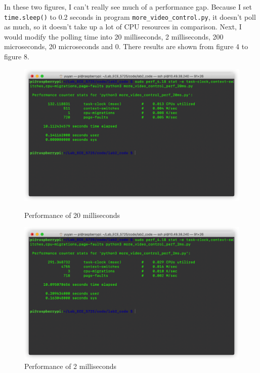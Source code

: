 \documentclass[12pt]{report}
\newcommand{\code}[1]{\colorbox{light-gray}{\texttt{#1}}}
\begin{document}
In these two figures, I can't really see much of a performance gap. Because I set \code{time.sleep()} to 0.2 seconds in program \code{more\_video\_control.py}, it doesn't poll as much, so it doesn't take up a lot of CPU resources in comparison. Next, I would modify the polling time into 20 milliseconds, 2 milliseconds, 200 microseconds, 20 microseconds and 0. There results are shown from figure 4 to figure 8.
\begin{figure}[H]
\centering
\begin{minipage}[t]{0.48\textwidth}
\centering
\includegraphics[width=\textwidth]{img/more_video_control_perf_20ms.png}
\caption{Performance of 20 milliseconds}
\label{fig:fig4}
\end{minipage}
\begin{minipage}[t]{0.48\textwidth}
\centering
\includegraphics[width=\textwidth]{img/more_video_control_perf_2ms.png}
\caption{Performance of 2 milliseconds}
\label{fig:fig5}
\end{minipage}
\end{figure}
\end{document}
